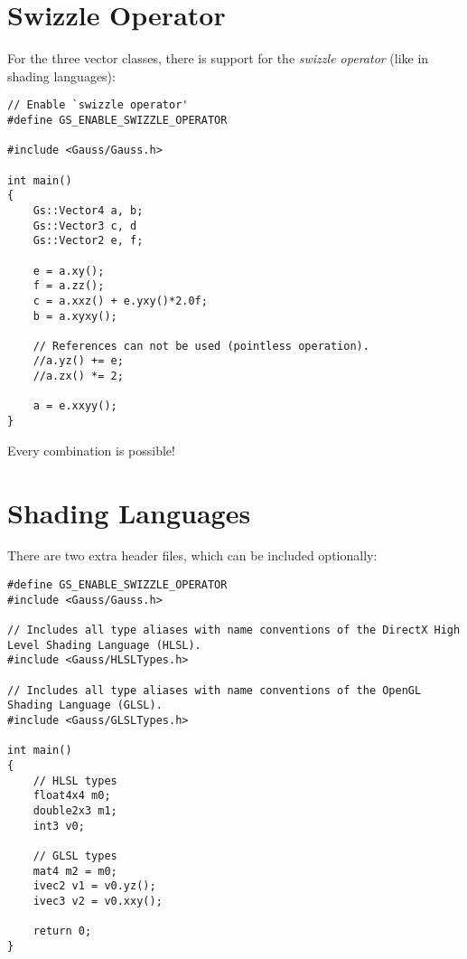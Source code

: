 \documentclass{article}
\begin{document}
\newpage

\section*{Swizzle Operator}

For the three vector classes, there is support for the \textit{swizzle operator} (like in shading languages):
\begin{lstlisting}
// Enable `swizzle operator'
#define GS_ENABLE_SWIZZLE_OPERATOR

#include <Gauss/Gauss.h>

int main()
{
	Gs::Vector4 a, b;
	Gs::Vector3 c, d
	Gs::Vector2 e, f;
	
	e = a.xy();
	f = a.zz();
	c = a.xxz() + e.yxy()*2.0f;
	b = a.xyxy();
	
	// References can not be used (pointless operation).
	//a.yz() += e;
	//a.zx() *= 2;
	
	a = e.xxyy();
}
\end{lstlisting}
Every combination is possible!



\section*{Shading Languages}

There are two extra header files, which can be included optionally:
\begin{lstlisting}
#define GS_ENABLE_SWIZZLE_OPERATOR
#include <Gauss/Gauss.h>

// Includes all type aliases with name conventions of the DirectX High Level Shading Language (HLSL).
#include <Gauss/HLSLTypes.h>

// Includes all type aliases with name conventions of the OpenGL Shading Language (GLSL).
#include <Gauss/GLSLTypes.h>

int main()
{
	// HLSL types
	float4x4 m0;
	double2x3 m1;
	int3 v0;
	
	// GLSL types
	mat4 m2 = m0;
	ivec2 v1 = v0.yz();
	ivec3 v2 = v0.xxy();
	
	return 0;
}
\end{lstlisting}
\end{document}
